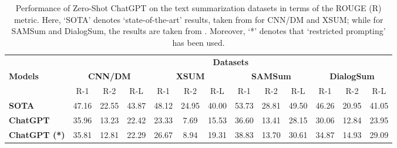 \documentclass[11pt]{article}
\begin{document}
\begin{table*}
\small 
\setlength{\tabcolsep}{3pt}
\centering
\begin{tabular}{lcccccccccccc}
\toprule
& \multicolumn{12}{c}{\textbf{Datasets}}  \\ 
\cmidrule(lr){2-13} 
{\textbf{Models}} & \multicolumn{3}{c}{\textbf{CNN/DM}} & \multicolumn{3}{c}{\textbf{XSUM}}  & \multicolumn{3}{c}{\textbf{SAMSum}} & \multicolumn{3}{c}{\textbf{DialogSum}}   \\ 
\cmidrule(lr){2-4}\cmidrule(lr){5-7}\cmidrule(lr){8-10}\cmidrule(lr){11-13}
 & R-1 & R-2 & R-L & R-1 & R-2 & R-L & R-1 & R-2 & R-L & R-1 & R-2 & R-L \\ \midrule
 \textbf{SOTA} & 47.16 & 22.55 & 43.87 &  48.12 & 24.95 & 40.00 & 53.73 & 28.81 & 49.50 & 46.26 & 20.95 & 41.05 \\ \textbf{ChatGPT} & 35.96 & 13.23 & 22.42 & 23.33 & 7.69 & 15.53 & 36.60 & 13.41 & 28.15 & 30.06 & 12.84 & 23.95 \\  \textbf{ChatGPT (*)} & 35.81 & 12.81 & 22.29 & 26.67 & 8.94 & 19.31 & 38.83 & 13.70 & 30.61 & 34.87 & 14.93 & 29.09 \\  
\bottomrule
\end{tabular}
\caption{\small{Performance of Zero-Shot ChatGPT on the text summarization datasets in terms of the ROUGE (R) metric. Here, `SOTA' denotes `state-of-the-art' results, taken from \citet{ravaut2022summareranker} for CNN/DM and XSUM; while for SAMSum and DialogSum, the results are taken from \citet{kim2022mindcolingdialogue}. Moreover, `*' denotes that `restricted prompting' has been used.}}
\label{tab:summarization}
\end{table*}
\end{document}
